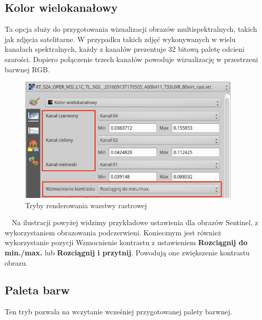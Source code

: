 \documentclass[12pt,a4paper]{book}
\begin{document}
\subsection{Kolor wielokanałowy}
Ta opcja służy do przygotowania wizualizacji obrazów multispektralnych, takich jak zdjęcia satelitarne. W przypadku takich zdjęć wykonywanych w wielu kanałach spektralnych, każdy z kanałów prezentuje 32 bitową paletę odcieni szarości. Dopiero połączenie trzech kanałów powoduje wizualizację w przestrzeni barwnej RGB. 
\begin{figure}[!ht]
	\centering
	\includegraphics[height=6cm]{007-kolor-multiband.png}
	\caption{Tryby renderowania warstwy rastrowej}
\end{figure}
\ \ Na ilustracji powyżej widzimy przykładowe ustawienia dla obrazów Sentinel, z wykorzystaniem obrazowania podczerwieni. Koniecznym jest również wykorzystanie pozycji Wzmocnienie kontrastu z ustawieniem \textbf{Rozciągnij do min./max.} lub \textbf{Rozciągnij i przytnij}. Powodują one zwiększenie kontrastu obrazu.

\subsection{Paleta barw}
Ten tryb pozwala na wczytanie wcześniej przygotowanej palety barwnej.
\end{document}
